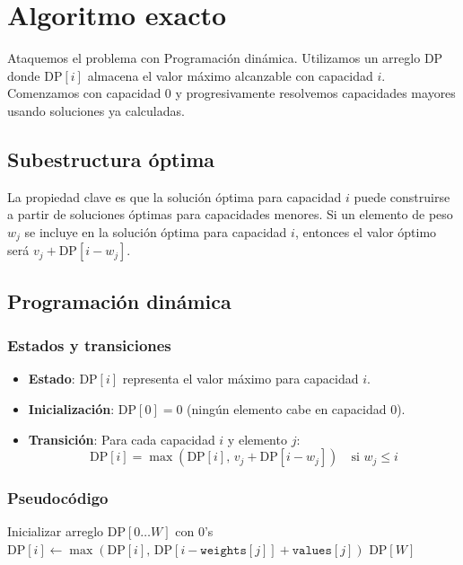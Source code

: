 \documentclass{report}
\begin{document}
\section{Algoritmo exacto}

Ataquemos el problema con Programación dinámica.
Utilizamos un arreglo $\text{DP}$ donde $\text{DP}[i]$ almacena el valor máximo alcanzable con capacidad $i$. Comenzamos con capacidad 0 y progresivamente resolvemos capacidades mayores usando soluciones ya calculadas.

\subsection*{Subestructura óptima}
La propiedad clave es que la solución óptima para capacidad $i$ puede construirse a partir de soluciones óptimas para capacidades menores. Si un elemento de peso $w_j$ se incluye en la solución óptima para capacidad $i$, entonces el valor óptimo será $v_j + \text{DP}[i - w_j]$.

\subsection{Programación dinámica}
\subsubsection*{Estados y transiciones}
\begin{itemize}
    \item \textbf{Estado}: $\text{DP}[i]$ representa el valor máximo para capacidad $i$.
    \item \textbf{Inicialización}: $\text{DP}[0] = 0$ (ningún elemento cabe en capacidad 0).
    \item \textbf{Transición}: Para cada capacidad $i$ y elemento $j$:
        \[
        \text{DP}[i] = \max\left(\text{DP}[i],\, v_j + \text{DP}[i - w_j]\right) \quad \text{si } w_j \leq i
        \]
\end{itemize}

\subsubsection*{Pseudocódigo}
\begin{algorithmic}[1]
    \State Inicializar arreglo $\text{DP}[0 \dots W]$ con 0's
                \State $\text{DP}[i] \gets \max(\text{DP}[i],\, \text{DP}[i - \texttt{weights}[j]] + \texttt{values}[j])$
            \EndIf
        \EndFor
    \EndFor
    \State \Return $\text{DP}[W]$
\EndProcedure
\end{algorithmic}
\end{document}
